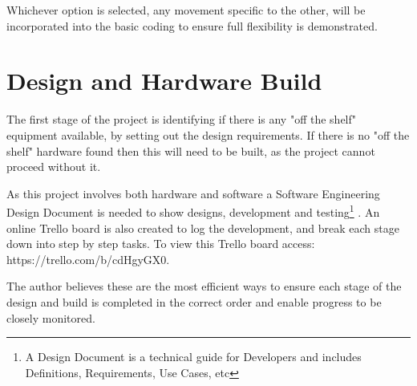\documentclass[progress]{cmpreport}
\begin{document}
Whichever option is selected, any movement specific to the other, will be incorporated into the basic coding to ensure full flexibility is demonstrated.

\section{Design and Hardware Build}
The first stage of the project is identifying if there is any "off the shelf" equipment available, by setting out the design requirements. If there is no "off the shelf" hardware found then this will need to be built, as the project cannot proceed without it.

As this project involves both hardware and software a Software Engineering Design Document is needed to show designs, development and testing\footnote{A Design Document is a technical guide for Developers and includes Definitions, Requirements, Use Cases, etc} \citep{mcelrath}. An online Trello board is also created to log the development, and break each stage down into step by step tasks. To view this Trello board access: https://trello.com/b/cdHgyGX0.

The author believes these are the most efficient ways to ensure each stage of the design and build is completed in the correct order and enable progress to be closely monitored.  \newline
\end{document}
